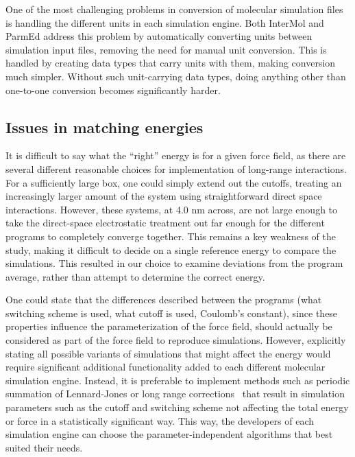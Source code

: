 One of the most challenging problems in conversion of molecular
simulation files is handling the different units in each simulation
engine. Both InterMol and ParmEd address this problem by automatically
converting units between simulation input files, removing the need for
manual unit conversion. This is handled by creating data types that
carry units with them, making conversion much simpler.  Without such
unit-carrying data types, doing anything other than one-to-one
conversion becomes significantly harder.

\subsection*{Issues in matching energies}

It is difficult to say what the ``right'' energy is for a given force field, as
there are several different reasonable choices for implementation of
long-range interactions. For a sufficiently large box, one could
simply extend out the cutoffs, treating an increasingly larger amount
of the system using straightforward direct space interactions.
However, these systems, at 4.0 nm across, are not large enough to take
the direct-space electrostatic treatment out far enough for the
different programs to completely converge together.  This remains a
key weakness of the study, making it difficult to decide on a single
reference energy to compare the simulations. This resulted in our
choice to examine deviations from the program average, rather than
attempt to determine the correct energy. 

One could state that the differences described between the programs
(what switching scheme is used, what cutoff is used, Coulomb's
constant), since these properties influence the parameterization of
the force field, should actually be considered as part of the force
field to reproduce simulations.  However, explicitly stating all
possible variants of simulations that might affect the energy would
require significant additional functionality added to each different
molecular simulation engine. Instead, it is preferable to
implement methods such as periodic summation of Lennard-Jones or long
range corrections~\citep{wu_isotropic_2005,veld_application_2007} that
result in simulation parameters such as the cutoff and switching
scheme not affecting the total energy or force in a statistically
significant way. This way, the developers of each simulation engine
can choose the parameter-independent algorithms that best suited
their needs.

